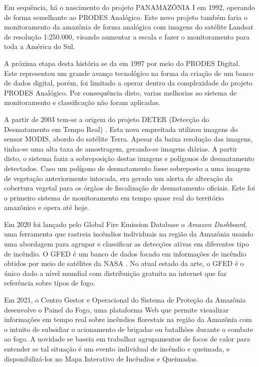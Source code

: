 Em sequência, há o nascimento do projeto PANAMAZÔNIA I \cite{panamazonia} em 1992, operando de forma semelhante ao PRODES Analógico. Este novo projeto também faria o monitoramento da amazônia de forma analógica com imagens do satélite Landsat de resolução 1:250.000, visando aumentar a escala e fazer o monitoramento para toda a América do Sul. 

A próxima etapa desta história se da em 1997 por meio do PRODES Digital. Este representou um grande avanço tecnológico na forma da criação de um banco de dados digital, porém, foi limitado a operar dentro da complexidade do projeto PRODES Analógico. Por consequência disto, varias melhorias ao sistema de monitoramento e classificação não foram aplicadas.

A partir de 2003 tem-se a origem do projeto DETER (Detecção do Desmatamento em Tempo Real) \cite{deter}. Esta nova empreitada utilizou imagens do sensor MODIS, abordo do satélite Terra. Apesar da baixa resolução das imagens, tinha-se uma alta taxa de amostragem, gerando-se imagens diárias. A partir disto, o sistema fazia a sobreposição destas imagens e polígonos de desmatamento detectados. Caso um polígono de desmatamento fosse sobreposto a uma imagem de vegetação anteriormente intocada, era gerado um alerta de alteração da cobertura vegetal para os órgãos de fiscalização de desmatamento oficiais. Este foi o primeiro sistema de monitoramento em tempo quase real do território amazônico e opera até hoje.

Em 2020 foi lançado pelo Global Fire Emission Database o \textit{Amazon Dashboard}, uma ferramenta que rastreia incêndios individuais na região da Amazônia usando uma abordagem para agrupar e classificar as detecções ativas em diferentes tipo de incêndio. O GFED é um banco de dados focado em informações de incêndio obtidos por meio de satélites da NASA \cite{gfed}. No atual estado da arte, o GFED é o único dado a nível mundial com distribuição gratuita na internet que faz referência sobre tipos de fogo. 

Em 2021, o Centro Gestor e Operacional do Sistema de Proteção da Amazônia desenvolve o Painel do Fogo, uma plataforma Web que permite visualizar informações em tempo real sobre incêndios florestais na região da Amazônia com o intuito de subsidiar o acionamento de brigadas ou batalhões durante o combate ao fogo. A novidade se baseia em trabalhar agrupamentos de focos de calor para entender se tal situação é um evento individual de incêndio e queimada, e disponibilizá-los no Mapa Interativo de Incêndios e Queimadas.





